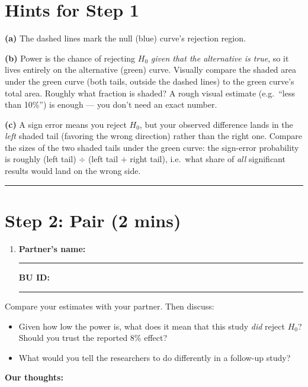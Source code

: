 \documentclass{article}
\newcommand{\nameblank}{\rule{1.75in}{0.4pt}}
\newcommand{\idblank}{\rule{1.55in}{0.4pt}}
\begin{document}
\newpage
\section*{Hints for Step 1}

\textbf{(a)} The dashed lines mark the null (blue) curve's rejection region. 

\vspace{0.2in}

\textbf{(b)} Power is the chance of rejecting $H_0$ \emph{given that the alternative is true}, so it lives entirely on the alternative (green) curve. Visually compare the shaded area under the green curve (both tails, outside the dashed lines) to the green curve's total area. Roughly what fraction is shaded? A rough visual estimate (e.g.\ ``less than 10\%'') is enough --- you don't need an exact number.

\vspace{0.2in}

\textbf{(c)} A sign error means you reject $H_0$, but your observed difference lands in the \emph{left} shaded tail (favoring the wrong direction) rather than the right one. Compare the sizes of the two shaded tails under the green curve: the sign-error probability is roughly (left tail) $\div$ (left tail $+$ right tail), i.e.\ what share of \emph{all} significant results would land on the wrong side.

\vspace{0.2in}
\noindent\rule{\linewidth}{0.4pt}

\section*{Step 2: Pair (2 mins)}

\begin{enumerate}[label=\arabic*.,leftmargin=*,itemsep=.7em, start=2]
  \item \textbf{Partner's name:} \nameblank \hfill \textbf{BU ID:} \idblank
\end{enumerate}

Compare your estimates with your partner. Then discuss:

\begin{itemize}
  \item Given how low the power is, what does it mean that this study \emph{did} reject $H_0$? Should you trust the reported 8\% effect?
  \item What would you tell the researchers to do differently in a follow-up study?
\end{itemize}

\textbf{Our thoughts:}
\vfill
\end{document}
